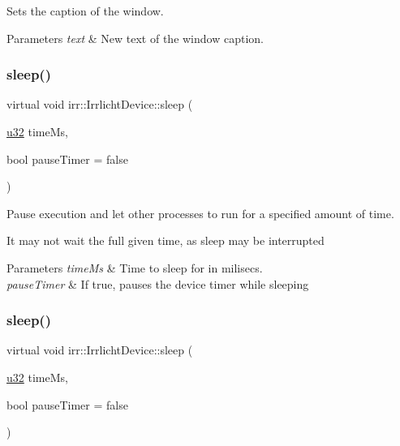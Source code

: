 Sets the caption of the window. 


\begin{DoxyParams}{Parameters}
{\em text} & New text of the window caption. \\
\hline
\end{DoxyParams}
\mbox{\label{classirr_1_1IrrlichtDevice_a89a3ecebc0e7c5ae08617b78a6e8a9f7}} 
\subsubsection{\texorpdfstring{sleep()}{sleep()}\hspace{0.1cm}{\footnotesize\ttfamily [1/3]}}
{\footnotesize\ttfamily virtual void irr\+::\+Irrlicht\+Device\+::sleep (\begin{DoxyParamCaption}\item[{\hyperlink{namespaceirr_a0416a53257075833e7002efd0a18e804}{u32}}]{time\+Ms,  }\item[{bool}]{pause\+Timer = {\ttfamily false} }\end{DoxyParamCaption})\hspace{0.3cm}{\ttfamily [pure virtual]}}



Pause execution and let other processes to run for a specified amount of time. 

It may not wait the full given time, as sleep may be interrupted 
\begin{DoxyParams}{Parameters}
{\em time\+Ms} & Time to sleep for in milisecs. \\
\hline
{\em pause\+Timer} & If true, pauses the device timer while sleeping \\
\hline
\end{DoxyParams}
\mbox{\label{classirr_1_1IrrlichtDevice_a89a3ecebc0e7c5ae08617b78a6e8a9f7}} 
\subsubsection{\texorpdfstring{sleep()}{sleep()}\hspace{0.1cm}{\footnotesize\ttfamily [2/3]}}
{\footnotesize\ttfamily virtual void irr\+::\+Irrlicht\+Device\+::sleep (\begin{DoxyParamCaption}\item[{\hyperlink{namespaceirr_a0416a53257075833e7002efd0a18e804}{u32}}]{time\+Ms,  }\item[{bool}]{pause\+Timer = {\ttfamily false} }\end{DoxyParamCaption})\hspace{0.3cm}{\ttfamily [pure virtual]}}



